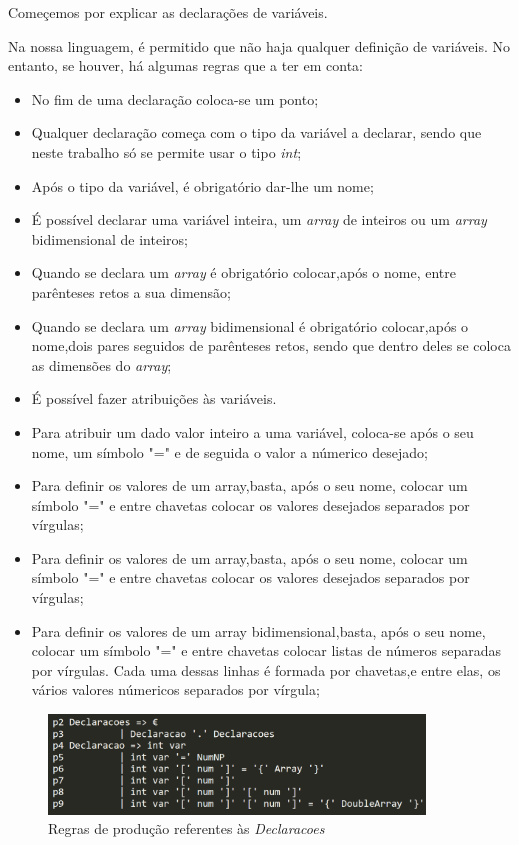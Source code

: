 \documentclass[11pt,a4paper]{report}
\begin{document}
\vspace{1ex}
Começemos por explicar as declarações de variáveis.\par
Na nossa linguagem, é permitido que não haja qualquer definição de variáveis. No entanto, se houver, há algumas regras que a ter em conta:
 \begin{itemize}
 	\item No fim de uma declaração coloca-se um ponto;
 	\item Qualquer declaração começa com o tipo da variável a declarar, sendo que neste trabalho só se permite usar o tipo \textit{int};
 	\item Após o tipo da variável, é obrigatório dar-lhe um nome;
 	\item É possível declarar uma variável inteira, um \textit{array} de inteiros ou um \textit{array} bidimensional de inteiros;
 	\item Quando se declara um \textit{array} é obrigatório colocar,após o nome, entre parênteses retos a sua dimensão;
 	\item Quando se declara um \textit{array} bidimensional é obrigatório colocar,após o nome,dois pares seguidos de parênteses retos, sendo que dentro deles se coloca as dimensões do \textit{array};
 	\item É possível fazer atribuições às variáveis.
 	\item Para atribuir um dado valor inteiro a uma variável, coloca-se após o seu nome,  um símbolo "=" e de seguida o valor a númerico desejado;
 	\item Para definir os valores de um array,basta, após o seu nome, colocar um símbolo "=" e entre chavetas colocar os valores desejados separados por vírgulas;
 	\item Para definir os valores de um array,basta, após o seu nome, colocar um símbolo "=" e entre chavetas colocar os valores desejados separados por vírgulas;
 	\item Para definir os valores de um array bidimensional,basta, após o seu nome, colocar um símbolo "=" e entre chavetas colocar listas de números separadas por vírgulas. Cada uma dessas linhas é formada por chavetas,e entre elas, os vários valores númericos separados por vírgula;
 	
 \end{itemize}
\vspace{3ex}
\begin{figure}[hbt!]
	\centering
	\hspace*{-1cm}
	\includegraphics[width=100mm,scale=4]{images/declaracoes}
	\caption{Regras de produção referentes às \textit{Declaracoes}}
\end{figure}
\end{document}
